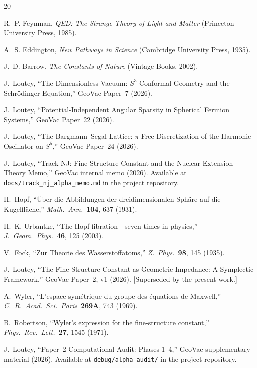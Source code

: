 \documentclass[aps,prl,twocolumn,superscriptaddress]{revtex4-2}
\begin{document}
\begin{thebibliography}{20}

R.~P. Feynman, \textit{QED: The Strange Theory of Light and Matter}
(Princeton University Press, 1985).

A.~S. Eddington, \textit{New Pathways in Science}
(Cambridge University Press, 1935).

J.~D. Barrow, \textit{The Constants of Nature}
(Vintage Books, 2002).

J.~Loutey, ``The Dimensionless Vacuum: $S^3$ Conformal Geometry and
the Schr\"odinger Equation,'' GeoVac Paper~7 (2026).

J.~Loutey, ``Potential-Independent Angular Sparsity in Spherical
Fermion Systems,'' GeoVac Paper~22 (2026).

J.~Loutey, ``The Bargmann--Segal Lattice: $\pi$-Free Discretization
of the Harmonic Oscillator on $S^5$,'' GeoVac Paper~24 (2026).

J.~Loutey, ``Track NJ: Fine Structure Constant and the Nuclear
Extension --- Theory Memo,'' GeoVac internal memo (2026). Available
at \texttt{docs/track\_nj\_alpha\_memo.md} in the project repository.

H.~Hopf, ``\"Uber die Abbildungen der dreidimensionalen Sph\"are auf
die Kugelfl\"ache,'' \textit{Math.\ Ann.}\ \textbf{104}, 637 (1931).

H.~K. Urbantke, ``The Hopf fibration---seven times in physics,''
\textit{J.\ Geom.\ Phys.}\ \textbf{46}, 125 (2003).

V.~Fock, ``Zur Theorie des Wasserstoffatoms,''
\textit{Z.\ Phys.}\ \textbf{98}, 145 (1935).

J.~Loutey, ``The Fine Structure Constant as Geometric Impedance: A
Symplectic Framework,'' GeoVac Paper~2, v1 (2026). [Superseded by
the present work.]

A.~Wyler, ``L'espace sym\'etrique du groupe des \'equations de
Maxwell,'' \textit{C.\ R.\ Acad.\ Sci.\ Paris}\ \textbf{269A}, 743
(1969).

B.~Robertson, ``Wyler's expression for the fine-structure constant,''
\textit{Phys.\ Rev.\ Lett.}\ \textbf{27}, 1545 (1971).

J.~Loutey, ``Paper~2 Computational Audit: Phases 1--4,'' GeoVac
supplementary material (2026). Available at
\texttt{debug/alpha\_audit/} in the project repository.


\end{thebibliography}
\end{document}
